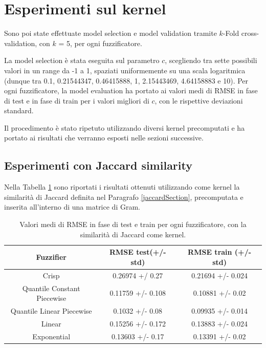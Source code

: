\documentclass[12pt,a4paper]{report}
\begin{document}
\section{Esperimenti sul kernel}

Sono poi state effettuate model selection e model validation tramite $k$-Fold cross-validation, con $k$ = 5, per ogni fuzzificatore.

La model selection è stata eseguita sul parametro $c$, scegliendo tra sette possibili valori in un range da -1 a 1, spaziati uniformemente su una scala logaritmica (dunque tra 0.1, 0.21544347, 0.46415888,  1,  2.15443469, 4.64158883 e 10).
Per ogni fuzzificatore, la model evaluation ha portato ai valori medi di RMSE in fase di test e in fase di train per i valori migliori di $c$, con le rispettive deviazioni standard.

Il procedimento è stato ripetuto utilizzando diversi kernel precomputati e ha portato ai risultati che verranno esposti nelle sezioni successive.

\subsection{Esperimenti con Jaccard similarity}
Nella Tabella \ref{table:risultatiJaccard} sono riportati i  risultati ottenuti utilizzando come kernel la similarità di Jaccard definita nel Paragrafo \ref{jaccardSection}, precomputata e inserita all'interno di una matrice di Gram.

\begin{table}[h!]
\small
\centering 	
	\begin{tabular}{|c|c|c|}
	 \hline
	 Fuzzifier & RMSE test(+/- std) & RMSE train (+/- std)\\ [0.5ex] 
	 \hline
	 Crisp & 0.26974 +/ 0.27 & 0.21694 +/- 0.024 \\ 
	 \hline
	 Quantile Constant Piecewise & 0.11759 +/- 0.108 & 0.10881 +/- 0.02\\
	 \hline
	 Quantile Linear Piecewise & 0.1032 +/- 0.08 & 0.09935 +/- 0.014\\
	 \hline
	 Linear & 0.15256 +/- 0.172 & 0.13883 +/- 0.024\\
	 \hline
	 Exponential  & 0.13603 +/- 0.17 & 0.13391 +/- 0.02\\ [1ex] 
	 \hline
	\end{tabular}
\caption{Valori medi di RMSE in fase di test e train per ogni fuzzificatore, con la similarità di Jaccard come kernel.}
\label{table:risultatiJaccard}
\end{table}
\end{document}
